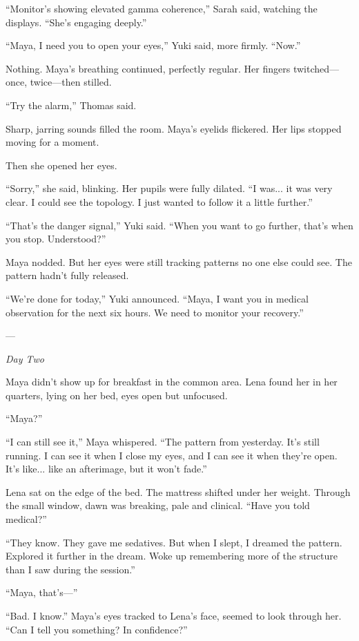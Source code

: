 ``Monitor's showing elevated gamma coherence,'' Sarah said, watching the displays. ``She's engaging deeply.''

``Maya, I need you to open your eyes,'' Yuki said, more firmly. ``Now.''

Nothing. Maya's breathing continued, perfectly regular. Her fingers twitched—once, twice—then stilled.

``Try the alarm,'' Thomas said.

Sharp, jarring sounds filled the room. Maya's eyelids flickered. Her lips stopped moving for a moment.

Then she opened her eyes.

``Sorry,'' she said, blinking. Her pupils were fully dilated. ``I was... it was very clear. I could see the topology. I just wanted to follow it a little further.''

``That's the danger signal,'' Yuki said. ``When you want to go further, that's when you stop. Understood?''

Maya nodded. But her eyes were still tracking patterns no one else could see. The pattern hadn't fully released.

``We're done for today,'' Yuki announced. ``Maya, I want you in medical observation for the next six hours. We need to monitor your recovery.''

---

\textit{Day Two}

Maya didn't show up for breakfast in the common area. Lena found her in her quarters, lying on her bed, eyes open but unfocused.

``Maya?''

``I can still see it,'' Maya whispered. ``The pattern from yesterday. It's still running. I can see it when I close my eyes, and I can see it when they're open. It's like... like an afterimage, but it won't fade.''

Lena sat on the edge of the bed. The mattress shifted under her weight. Through the small window, dawn was breaking, pale and clinical. ``Have you told medical?''

``They know. They gave me sedatives. But when I slept, I dreamed the pattern. Explored it further in the dream. Woke up remembering more of the structure than I saw during the session.''

``Maya, that's—''

``Bad. I know.'' Maya's eyes tracked to Lena's face, seemed to look through her. ``Can I tell you something? In confidence?''

